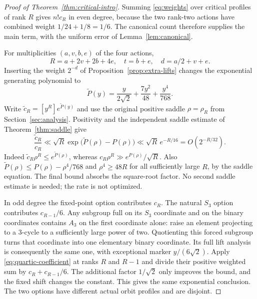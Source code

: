 \begin{proof}[Proof of Theorem~\ref{thm:critical-intro}]
Summing \eqref{eq:weights} over critical profiles of rank $R$ gives
$n!c_R$ in even degree, because the two rank-two actions have combined
weight $1/24+1/8=1/6$. The canonical count therefore supplies the main
term, with the uniform error of Lemma~\ref{lem:canonical}.

For multiplicities $(a,v,b,e)$ of the four actions,
\[
 R=a+2v+2b+4e,\quad t=b+e,\quad d=a/2+v+e.
\]
Inserting the weight $2^{-d}$ of Proposition~\ref{prop:extra-lifts}
changes the exponential generating polynomial to
\begin{equation}\label{eq:tilde-P}
 \widetilde P(y)=\frac{y}{2\sqrt2}+\frac{7y^2}{48}
                         +\frac{y^4}{768}.
\end{equation}
Write $\widetilde c_R=[y^R]e^{\widetilde P(y)}$ and use the original
positive saddle $\rho=\rho_R$ from Section~\ref{sec:analysis}.
Positivity and the independent saddle estimate of Theorem~\ref{thm:saddle}
give
\begin{equation}\label{eq:quartic-coefficient}
 \frac{\widetilde c_R}{c_R}
 \ll \sqrt R\exp\bigl(\widetilde P(\rho)-P(\rho)\bigr)
 \ll \sqrt R\,e^{-R/16}
 =O(2^{-R/32}).
\end{equation}
Indeed $\widetilde c_R\rho^R\leq e^{\widetilde P(\rho)}$,
whereas $c_R\rho^R\gg e^{P(\rho)}/\sqrt R$.
Also $\widetilde P(\rho)\leq P(\rho)-\rho^4/768$ and
$\rho^4\geq48R$ for all sufficiently large $R$, by the saddle equation.
The final bound absorbs the square-root factor. No second saddle estimate
is needed; the rate is not optimized.

In odd degree the fixed-point option contributes $c_R$. The natural
$S_3$ option contributes $c_{R-1}/6$. Any subgroup full on its $S_3$
coordinate and on the binary coordinates contains $A_3$ on the first
coordinate alone: raise an element projecting to a $3$-cycle to a
sufficiently large power of two. Quotienting this forced subgroup turns
that coordinate into one elementary binary coordinate. Its full lift
analysis is consequently the same one, with exceptional marker
$y/(6\sqrt2)$. Apply \eqref{eq:quartic-coefficient} at ranks $R$ and
$R-1$ and divide their positive weighted sum by $c_R+c_{R-1}/6$.
The additional factor $1/\sqrt2$ only improves the bound, and the fixed
shift changes the constant. This gives the same exponential conclusion.
The two options have different actual orbit profiles and are disjoint.
\end{proof}
